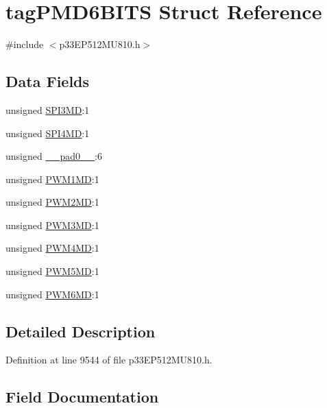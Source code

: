 \hypertarget{structtag_p_m_d6_b_i_t_s}{}\section{tag\+P\+M\+D6\+B\+I\+TS Struct Reference}
\label{structtag_p_m_d6_b_i_t_s}


{\ttfamily \#include $<$p33\+E\+P512\+M\+U810.\+h$>$}

\subsection*{Data Fields}
\begin{DoxyCompactItemize}
\item 
unsigned \hyperlink{structtag_p_m_d6_b_i_t_s_a8549d36169776fc4052ce9e2e6a9d68e}{S\+P\+I3\+MD}\+:1
\item 
unsigned \hyperlink{structtag_p_m_d6_b_i_t_s_aee9f827b4331dd5d16c15109d239db7d}{S\+P\+I4\+MD}\+:1
\item 
unsigned \hyperlink{structtag_p_m_d6_b_i_t_s_adf71f3d8410c1f1dbbc96680a92c49af}{\+\_\+\+\_\+pad0\+\_\+\+\_\+}\+:6
\item 
unsigned \hyperlink{structtag_p_m_d6_b_i_t_s_ae3db28ac501d2a3bb7250a95e88933ec}{P\+W\+M1\+MD}\+:1
\item 
unsigned \hyperlink{structtag_p_m_d6_b_i_t_s_abc1282116bc7aa439b2516a747060404}{P\+W\+M2\+MD}\+:1
\item 
unsigned \hyperlink{structtag_p_m_d6_b_i_t_s_a3365bf3675c5b06b0eaa0d64a2a58fe2}{P\+W\+M3\+MD}\+:1
\item 
unsigned \hyperlink{structtag_p_m_d6_b_i_t_s_a0cc5f32e88dc0778370559b30902d335}{P\+W\+M4\+MD}\+:1
\item 
unsigned \hyperlink{structtag_p_m_d6_b_i_t_s_a92b797d44ab2ae446cf7bf9dc2c4a11d}{P\+W\+M5\+MD}\+:1
\item 
unsigned \hyperlink{structtag_p_m_d6_b_i_t_s_af100036ac49ec72f483e2d6500216aed}{P\+W\+M6\+MD}\+:1
\end{DoxyCompactItemize}


\subsection{Detailed Description}


Definition at line 9544 of file p33\+E\+P512\+M\+U810.\+h.



\subsection{Field Documentation}
\mbox{\label{structtag_p_m_d6_b_i_t_s_adf71f3d8410c1f1dbbc96680a92c49af}} 
